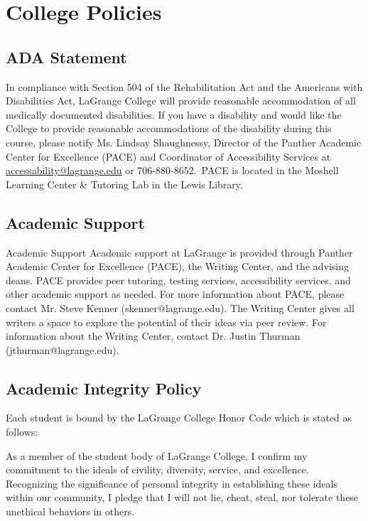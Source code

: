 \documentclass[11pt]{article}
\begin{document}
\section*{College Policies}

\subsection*{ADA Statement}

In compliance with Section 504 of the Rehabilitation Act and the Americans with Disabilities Act,
LaGrange College will provide reasonable accommodation of all medically documented disabilities. If you
have a disability and would like the College to provide reasonable accommodations of the disability during
this course, please notify Ms. Lindsay Shaughnessy, Director of the Panther Academic Center for
Excellence (PACE) and Coordinator of Accessibility Services at \href{mailto:accessability@lagrange.edu}{accessability@lagrange.edu} or 706-880-8652. PACE is located in the Moshell Learning Center \&
Tutoring Lab in the Lewis Library.


\subsection*{Academic Support}

Academic Support
Academic support at LaGrange is provided through Panther Academic Center for Excellence (PACE), the
Writing Center, and the advising deans. PACE provides peer tutoring, testing services, accessibility
services, and other academic support as needed. For more information about PACE, please contact Mr.
Steve Kenner (skenner@lagrange.edu). The Writing Center gives all writers a space to explore the potential of their ideas via peer review. For information about the Writing Center, contact Dr. Justin Thurman
(jthurman@lagrange.edu).

\subsection*{Academic Integrity Policy}

Each student is bound by the LaGrange College Honor Code which is stated as follows:

\begin{displayquote}
As a member of the student body of LaGrange College, I confirm my
commitment to the ideals of civility, diversity, service, and excellence.
Recognizing the significance of personal integrity in establishing these ideals
within our community, I pledge that I will not lie, cheat, steal, nor tolerate these
unethical behaviors in others.
\end{displayquote}
\end{document}
